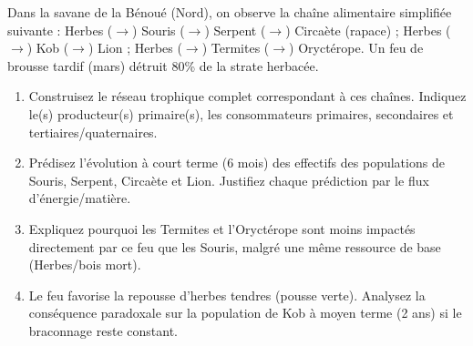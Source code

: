 \documentclass[11pt]{article}
\begin{document}
\begin{exercice}
Dans la savane de la Bénoué (Nord), on observe la chaîne alimentaire simplifiée suivante : Herbes ($\to$) Souris ($\to$) Serpent ($\to$) Circaète (rapace) ; Herbes ($\to$) Kob ($\to$) Lion ; Herbes ($\to$) Termites ($\to$) Oryctérope. Un feu de brousse tardif (mars) détruit 80\% de la strate herbacée.

\begin{enumerate}
\item Construisez le réseau trophique complet correspondant à ces chaînes. Indiquez le(s) producteur(s) primaire(s), les consommateurs primaires, secondaires et tertiaires/quaternaires.
\item Prédisez l'évolution à court terme (6 mois) des effectifs des populations de Souris, Serpent, Circaète et Lion. Justifiez chaque prédiction par le flux d'énergie/matière.
\item Expliquez pourquoi les Termites et l'Oryctérope sont moins impactés directement par ce feu que les Souris, malgré une même ressource de base (Herbes/bois mort).
\item Le feu favorise la repousse d'herbes tendres (pousse verte). Analysez la conséquence paradoxale sur la population de Kob à moyen terme (2 ans) si le braconnage reste constant.
\end{enumerate}
\end{exercice}
\end{document}
